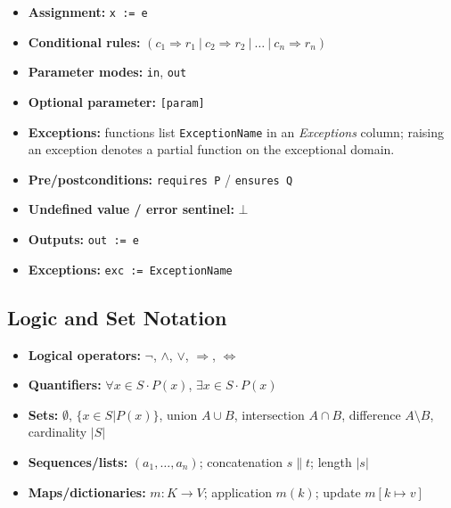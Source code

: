 \documentclass[12pt, titlepage]{article}
\begin{document}
\begin{itemize}
  \item \textbf{Assignment:} \texttt{x := e}
  \item \textbf{Conditional rules:}
        $(c_1 \Rightarrow r_1\ |\ c_2 \Rightarrow r_2\ |\ \dots\ |\ c_n \Rightarrow r_n)$
  \item \textbf{Parameter modes:} \texttt{in}, \texttt{out}
  \item \textbf{Optional parameter:} \texttt{[param]}
  \item \textbf{Exceptions:} functions list \texttt{ExceptionName} in an
        \emph{Exceptions} column; raising an exception denotes a partial function
        on the exceptional domain.
  \item \textbf{Pre/postconditions:} \texttt{requires P} / \texttt{ensures Q}
  \item \textbf{Undefined value / error sentinel:} $\bot$
  \item \textbf{Outputs:} \texttt{out := e}
  \item \textbf{Exceptions:} \texttt{exc := ExceptionName}
\end{itemize}

\subsection{Logic and Set Notation}

\begin{itemize}
  \item \textbf{Logical operators:} $\neg$, $\land$, $\lor$, $\Rightarrow$, $\Leftrightarrow$
  \item \textbf{Quantifiers:} $\forall x \in S \cdot P(x)$, $\exists x \in S \cdot P(x)$
  \item \textbf{Sets:} $\emptyset$, $\{x \in S | P(x)\}$, union $A \cup B$, intersection $A \cap B$, difference $A \setminus B$, cardinality $|S|$
  \item \textbf{Sequences/lists:} $(a_1,\dots,a_n)$; concatenation $s \| t$; length $|s|$
  \item \textbf{Maps/dictionaries:} $m : K \rightarrow V$; application $m(k)$; update $m[k \mapsto v]$
\end{itemize}
\end{document}
